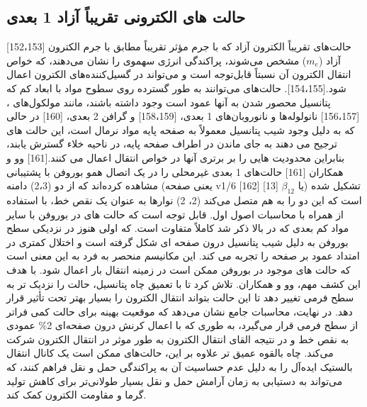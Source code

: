 \subsection{حالت های الکترونی تقریباً آزاد 1 بعدی}
\cite{eknapakulNearlyfreeelectronSystemMonolayer2016, fengElectronicPropertiesSuperatom2011}[152،153] حالت‌های تقریباً الکترون آزاد  که با جرم مؤثر تقریباً مطابق با جرم الکترون آزاد ($m_e$) مشخص می‌شوند، پراکندگی انرژی سهموی را نشان می‌دهند، که خواص انتقال الکترون آن نسبتاً قابل‌توجه است و می‌تواند در گسیل‌کننده‌های الکترون اعمال شود.[154،155]. حالت‌های  می‌توانند به طور گسترده روی سطوح مواد با ابعاد کم که پتانسیل محصور شدن به آنها عمود است وجود داشته باشند، مانند مولکول‌های ، \cite{zhaoSuperatomStatesFullerenes2009, fengAtomlikeHollowcoreboundMolecular2008}[156،157] نانولوله‌ها و نانوروبان‌های 1 بعدی، \cite{yamanakaElectronInjectionNearly2014, huNearlyFreeElectron2010}[158،159] و گرافن 2 بعدی، \cite{silkinImagePotentialStates2009}[160] در حالی که به دلیل وجود شیب پتانسیل معمولاً به صفحه پایه مواد نرمال است، این حالت های  ترجیح می دهند به جای ماندن در اطراف صفحه پایه، در ناحیه خلاء گسترش یابند، بنابراین محدودیت هایی را بر برتری آنها در خواص انتقال اعمال می کنند.\cite{kongOnedimensionalNearlyFree2019}[161] وو و همکاران \cite{kongOnedimensionalNearlyFree2019}[161] حالت‌های  1 بعدی غیرمحلی را در یک اتصال همو بوروفن با پشتیبانی  مشاهده کرده‌اند که از دو (2،3) دامنه (یعنی صفحه v1/6 \cite{zhangTwoDimensionalBoronMonolayers2015}[162] یا $\beta_{12}$ \cite{fengExperimentalRealizationTwodimensional2016}[13]) تشکیل شده است که این دو را به هم متصل می‌کند (2، 2) نوارها به عنوان یک نقص خط، با استفاده از  همراه با محاسبات اصول اول. قابل توجه است که حالت های  در بوروفن با سایر مواد کم بعدی که در بالا ذکر شد کاملاً متفاوت است. که اولی هنوز در نزدیکی سطح بوروفن به دلیل شیب پتانسیل درون صفحه ای شکل گرفته است و اختلال کمتری در امتداد عمود بر صفحه را تجربه می کند. این مکانیسم منحصر به فرد به این معنی است که حالت های  موجود در بوروفن ممکن است در زمینه انتقال بار اعمال شود. با هدف این کشف مهم، وو و همکاران. تلاش کرد تا با تعمیق چاه پتانسیل، حالت  را نزدیک تر به سطح فرمی تغییر دهد تا این حالت بتواند انتقال الکترون را بسیار بهتر تحت تأثیر قرار دهد. در نهایت، محاسبات جامع نشان می‌دهد که موقعیت بهینه برای حالت  کمی فراتر از سطح فرمی قرار می‌گیرد، به طوری که با اعمال کرنش درون صفحه‌ای 2\% عمودی به نقص خط و در نتیجه القای انتقال الکترون به طور موثر در انتقال الکترون شرکت می‌کند. چاه بالقوه عمیق تر علاوه بر این، حالت‌های  ممکن است یک کانال انتقال بالستیک ایده‌آل را به دلیل عدم حساسیت آن به پراکندگی حمل و نقل فراهم کنند، که می‌تواند به دستیابی به زمان آرامش حمل و نقل بسیار طولانی‌تر برای کاهش تولید گرما و مقاومت الکترون کمک کند.

